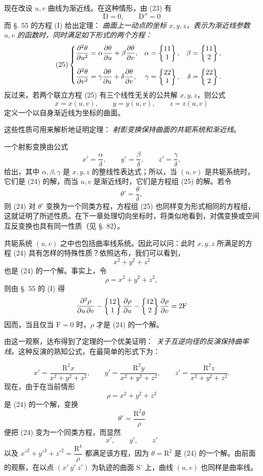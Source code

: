 现在改设 \(u,v\) 曲线为渐近线。在这种情形，由 (23) 有
\[
\mathrm{D}=0, \qquad \mathrm{D''}=0
\]
而 §. 55 的方程 (I) 给出定理：
\emph{曲面上一动点的坐标 \(x,y,z\)，表示为渐近线参数 \(u,v\) 的函数时，同时满足如下形式的两个方程：}
\begin{equation}\tag{25}
\left\{
\begin{aligned}
\frac{\partial^2\theta}{\partial u^2}&=\alpha\frac{\partial\theta}{\partial u}+\beta\frac{\partial\theta}{\partial v},
& \alpha&=\left\{\begin{matrix}11\\1\end{matrix}\right\},& \beta&=\left\{\begin{matrix}11\\2\end{matrix}\right\},\\[0.5em]
\frac{\partial^2\theta}{\partial v^2}&=\gamma\frac{\partial\theta}{\partial u}+\delta\frac{\partial\theta}{\partial v},
& \gamma&=\left\{\begin{matrix}22\\1\end{matrix}\right\},& \delta&=\left\{\begin{matrix}22\\2\end{matrix}\right\}.
\end{aligned}
\right.
\end{equation}
反过来，若两个联立方程 (25) 有三个线性无关的公共解 \(x,y,z\)，则公式
\[
x=x(u,v), \qquad y=y(u,v), \qquad z=z(u,v)
\]
定义一个以自身渐近线为坐标的曲面。

这些性质可用来解析地证明定理：
\emph{射影变换保持曲面的共轭系统和渐近线}。

一个射影变换由公式
\[
x'=\frac{\alpha}{\delta}, \qquad y'=\frac{\beta}{\delta}, \qquad z'=\frac{\gamma}{\delta},
\]
给出，其中 \(\alpha,\beta,\gamma\) 是 \(x,y,z\) 的整线性表达式；所以，当 \((u,v)\) 是共轭系统时，它们是 (24) 的解，而当 \(u,v\) 是渐近线时，它们是方程组 (25) 的解。若令
\[
\theta'=\frac{\theta}{\delta},
\]
则 (24) 对 \(\theta'\) 变换为一个同类方程，方程组 (25) 也同样变为形式相同的方程组，这就证明了所述性质。在下一章处理切向坐标时，将类似地看到，对偶变换或空间互反变换也具有同一性质（见 §. 82）。

共轭系统 \((u,v)\) 之中也包括曲率线系统。因此可以问：此时 \(x,y,z\) 所满足的方程 (24) 具有怎样的特殊性质？依照达布，我们可以看到，
\[
x^2+y^2+z^2
\]
也是 (24) 的一个解。事实上，令
\[
\rho=x^2+y^2+z^2,
\]
则由 §. 55 的 (I) 得
\[
\frac{\partial^2\rho}{\partial u\,\partial v}-\left\{\begin{matrix}12\\1\end{matrix}\right\}\frac{\partial\rho}{\partial u}-\left\{\begin{matrix}12\\2\end{matrix}\right\}\frac{\partial\rho}{\partial v}=2\mathrm{F}
\]
因而，当且仅当 \(\mathrm{F}=0\) 时，\(\rho\) 才是 (24) 的一个解。

\begin{sloppypar}
由这一观察，达布得到了定理的一个优美证明：\nobreak\ \emph{关于互逆向径的反演保持曲率线。}这种反演的熟知公式，在最简单的形式下为：
\end{sloppypar}
\[
x'=\frac{\mathrm{R}^2x}{x^2+y^2+z^2}, \qquad
 y'=\frac{\mathrm{R}^2y}{x^2+y^2+z^2}, \qquad
 z'=\frac{\mathrm{R}^2z}{x^2+y^2+z^2}.
\]
现在，由于在当前情形
\[
\rho=x^2+y^2+z^2
\]
是 (24) 的一个解，变换
\[
\theta'=\frac{\mathrm{R}^2\theta}{\rho}
\]
便把 (24) 变为一个同类方程，而显然
\[
x', \qquad y', \qquad z'
\]
以及 \(x'^2+y'^2+z'^2=\dfrac{\mathrm{R}^4}{\rho}\) 都满足该方程，因为 \(\theta=\mathrm{R}^2\) 是 (24) 的一个解。由前面的观察，在以点 \((x'\ y'\ z')\) 为轨迹的曲面 S' 上，曲线 \((u,v)\) 也同样是曲率线。

